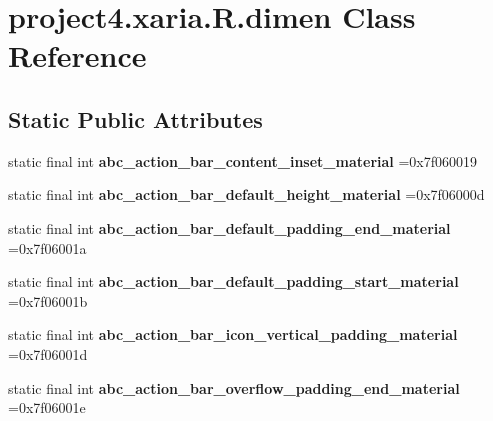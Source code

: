 \hypertarget{classproject4_1_1xaria_1_1R_1_1dimen}{}\section{project4.\+xaria.\+R.\+dimen Class Reference}
\label{classproject4_1_1xaria_1_1R_1_1dimen}
\subsection*{Static Public Attributes}
\begin{DoxyCompactItemize}
\item 
\mbox{\label{classproject4_1_1xaria_1_1R_1_1dimen_a52e03c1e41bb9a8a45e5b431d8928800}} 
static final int {\bfseries abc\+\_\+action\+\_\+bar\+\_\+content\+\_\+inset\+\_\+material} =0x7f060019
\item 
\mbox{\label{classproject4_1_1xaria_1_1R_1_1dimen_a0372b691877fda170c6eccc703f964b2}} 
static final int {\bfseries abc\+\_\+action\+\_\+bar\+\_\+default\+\_\+height\+\_\+material} =0x7f06000d
\item 
\mbox{\label{classproject4_1_1xaria_1_1R_1_1dimen_a92867f8887fc8582081265964a0f555f}} 
static final int {\bfseries abc\+\_\+action\+\_\+bar\+\_\+default\+\_\+padding\+\_\+end\+\_\+material} =0x7f06001a
\item 
\mbox{\label{classproject4_1_1xaria_1_1R_1_1dimen_a27b3f2462b012e72c4745bcb46cad672}} 
static final int {\bfseries abc\+\_\+action\+\_\+bar\+\_\+default\+\_\+padding\+\_\+start\+\_\+material} =0x7f06001b
\item 
\mbox{\label{classproject4_1_1xaria_1_1R_1_1dimen_a46355e89d57bdfa84b0d1e381876d314}} 
static final int {\bfseries abc\+\_\+action\+\_\+bar\+\_\+icon\+\_\+vertical\+\_\+padding\+\_\+material} =0x7f06001d
\item 
\mbox{\label{classproject4_1_1xaria_1_1R_1_1dimen_a00f0e526a58d8907e427b390d0da927b}} 
static final int {\bfseries abc\+\_\+action\+\_\+bar\+\_\+overflow\+\_\+padding\+\_\+end\+\_\+material} =0x7f06001e

\end{DoxyCompactItemize}
